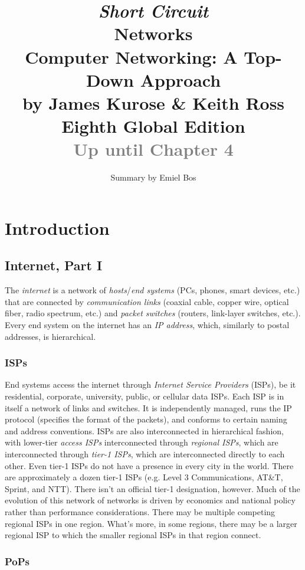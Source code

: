 \documentclass[8pt, table, xcdraw]{article}%
\title{
\textit{Short Circuit}\\
\vspace{15px}
\huge
Networks\\
\vspace{20px}
\large
Computer Networking: A Top-Down Approach\\
by James Kurose \& Keith Ross\\
Eighth Global Edition\\
\textcolor{gray}{Up until Chapter 4}
}
\author{Summary by Emiel Bos}
\date{}
\begin{document}
\maketitle

\section{Introduction} \label{ch:intro}

\subsection{Internet, Part I}

The \emph{internet} is a network of \emph{hosts}/\emph{end systems} (PCs, phones, smart devices, etc.) that are connected by \emph{communication links} (coaxial cable, copper wire, optical fiber, radio spectrum, etc.) and \emph{packet switches} (routers, link-layer switches, etc.). Every end system on the internet has an \emph{IP address}, which, similarly to postal addresses, is hierarchical.

\subsubsection{ISPs} \label{ISPs}

End systems access the internet through \emph{Internet Service Providers} (ISPs), be it residential, corporate, university, public, or cellular data ISPs. Each ISP is in itself a network of links and switches. It is independently managed, runs the IP protocol (specifies the format of the packets), and conforms to certain naming and address conventions. ISPs are also interconnected in hierarchical fashion, with lower-tier \emph{access ISPs} interconnected through \emph{regional ISPs}, which are interconnected through \emph{tier-1 ISPs}, which are interconnected directly to each other. Even tier-1 ISPs do not have a presence in every city in the world. There are approximately a dozen tier-1 ISPs (e.g. Level 3 Communications, AT\&T, Sprint, and NTT). There isn't an official tier-1 designation, however. Much of the evolution of this network of networks is driven by economics and national policy rather than performance considerations. There may be multiple competing regional ISPs in one region. What's more, in some regions, there may be a larger regional ISP to which the smaller regional ISPs in that region connect.

\subsubsection{PoPs}
\end{document}
